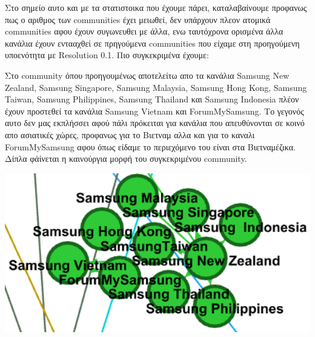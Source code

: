 \documentclass[12pt]{article}
\begin{document}
	\newpage
	Στο σημείο αυτο και με τα στατιστοικα που έχουμε πάρει, καταλαβαίνουμε προφανως πως ο αριθμος των communities έχει μειωθεί, δεν υπάρχουν πλεον ατομικά communities αφου έχουν συγωνευθει με άλλα, ενω ταυτόχρονα ορισμένα άλλα κανάλια έχουν εντααχθεί σε πρηγούμενα communities που είχαμε στη προηγούμενη υποενότητα με Resolution 0.1. Πιο συγκεκριμένα έχουμε:
	
	\vspace{12pt}
	\vspace{12pt}
	\vspace{12pt}
	\begin{minipage}{0.6\textwidth}
		Στο community όπου προηγουμένως αποτελείτω απο τα κανάλια Samsung New Zealand, Samsung Singapore, Samsung Malaysia, Samsung Hong Kong, Samsung Taiwan, Samsung Philippines, Samsung Thailand και Samsung Indonesia πλέον έχουν προστεθεί τα κανάλια Samsung Vietnam και ForumMySamsung. Το γεγονός αυτο δεν μας εκπλήσσει αφού πάλι πρόκειται για κανάλια που απευθύνονται σε κοινό απο ασιατικές χώρες, προφανως για το Βιετναμ αλλα και για το καναλι ForumMySamsung αφου όπως είδαμε το περιεχόμενο του είναι στα Βιετναμέζικα. Δίπλα φάίνεται η καινούργια μορφή του συγκεκριμένου community.
	\end{minipage}
	\hspace{0.05\textwidth}
	\begin{minipage}{0.3\textwidth}
		\includegraphics[width=1.15\textwidth]{photos-files/section12/0.5/vietnam_j_forum.png}
	\end{minipage}
	
	
	
	
	
	
	
	
	
\end{document}
